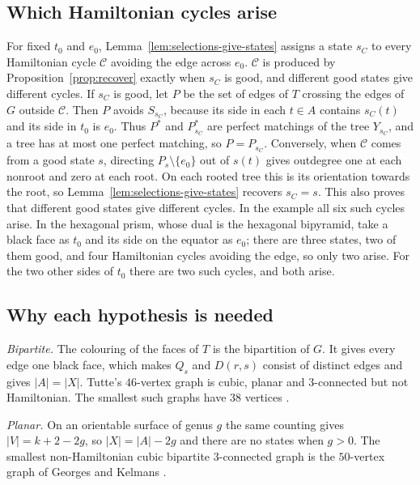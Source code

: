 \documentclass[10pt]{amsart}
\numberwithin{equation}{section}
\theoremstyle{definition}
\theoremstyle{remark}
\newcommand{\T}{T}
\begin{document}
\subsection*{Which Hamiltonian cycles arise}
For fixed $t_0$ and $e_0$, Lemma~\ref{lem:selections-give-states} assigns a state $s_C$ to every Hamiltonian cycle $\mathcal{C}$ avoiding the edge across $e_0$.
$\mathcal{C}$ is produced by Proposition~\ref{prop:recover} exactly when $s_C$ is good, and different good states give different cycles.
If $s_C$ is good, let $P$ be the set of edges of $\T$ crossing the edges of $G$ outside $\mathcal{C}$. Then $P$ avoids $S_{s_C}$, because its side in each $t\in A$ contains $s_C(t)$ and its side in $t_0$ is $e_0$.
Thus $P^*$ and $P_{s_C}^*$ are perfect matchings of the tree $Y_{s_C}$, and a tree has at most one perfect matching, so $P=P_{s_C}$.
Conversely, when $\mathcal{C}$ comes from a good state $s$, directing $P_s\setminus\{e_0\}$ out of $s(t)$ gives outdegree one at each nonroot and zero at each root.
On each rooted tree this is its orientation towards the root, so Lemma~\ref{lem:selections-give-states} recovers $s_C=s$.
This also proves that different good states give different cycles.
In the example all six such cycles arise.
In the hexagonal prism, whose dual is the hexagonal bipyramid, take a black face as $t_0$ and its side on the equator as $e_0$; there are three states, two of them good, and four Hamiltonian cycles avoiding the edge, so only two arise.
For the two other sides of $t_0$ there are two such cycles, and both arise.

\subsection*{Why each hypothesis is needed}
\emph{Bipartite.} The colouring of the faces of $\T$ is the bipartition of $G$. It gives every edge one black face, which makes $Q_s$ and $D(r,s)$ consist of distinct edges and gives $|A|=|X|$.
Tutte's $46$-vertex graph \cite{Tutte1946} is cubic, planar and $3$-connected but not Hamiltonian. The smallest such graphs have $38$ vertices \cite{holton-mckay1988}.

\emph{Planar.} On an orientable surface of genus $g$ the same counting gives $|V|=k+2-2g$, so $|X|=|A|-2g$ and there are no states when $g>0$. The smallest non-Hamiltonian cubic bipartite $3$-connected graph is the $50$-vertex graph of Georges and Kelmans \cite{georges1989,Brinkmann2022}.
\end{document}

